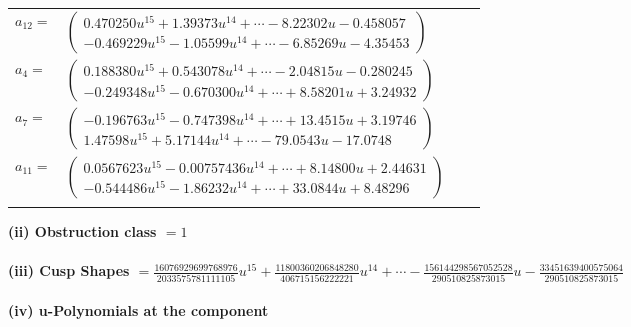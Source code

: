 \documentclass[1p]{elsarticle_modified}
\theoremstyle{definition}
\begin{document}
\begin{tabular}{m{7pt} m{180pt} m{7pt} m{180pt} }
\flushright $a_{12}=$&$\begin{pmatrix}0.470250 u^{15}+1.39373 u^{14}+\cdots-8.22302 u-0.458057\\-0.469229 u^{15}-1.05599 u^{14}+\cdots-6.85269 u-4.35453\end{pmatrix}$ \\
\flushright $a_{4}=$&$\begin{pmatrix}0.188380 u^{15}+0.543078 u^{14}+\cdots-2.04815 u-0.280245\\-0.249348 u^{15}-0.670300 u^{14}+\cdots+8.58201 u+3.24932\end{pmatrix}$ \\
\flushright $a_{7}=$&$\begin{pmatrix}-0.196763 u^{15}-0.747398 u^{14}+\cdots+13.4515 u+3.19746\\1.47598 u^{15}+5.17144 u^{14}+\cdots-79.0543 u-17.0748\end{pmatrix}$ \\
\flushright $a_{11}=$&$\begin{pmatrix}0.0567623 u^{15}-0.00757436 u^{14}+\cdots+8.14800 u+2.44631\\-0.544486 u^{15}-1.86232 u^{14}+\cdots+33.0844 u+8.48296\end{pmatrix}$\\&\end{tabular}
\flushleft \textbf{(ii) Obstruction class $= 1$}\\~\\
\flushleft \textbf{(iii) Cusp Shapes $= \frac{16076929699768976}{2033575781111105} u^{15}+\frac{11800360206848280}{406715156222221} u^{14}+\cdots-\frac{156144298567052528}{290510825873015} u-\frac{33451639400575064}{290510825873015}$}\\~\\
\newpage\renewcommand{\arraystretch}{1}
\flushleft \textbf{(iv) u-Polynomials at the component}\newline \\
\end{document}
